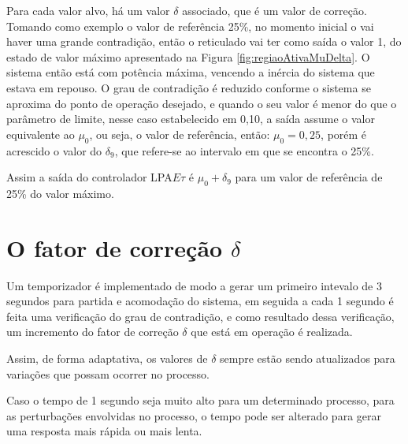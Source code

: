 Para cada valor alvo, há um valor $\delta$ associado, 
que é um valor de correção.
Tomando como exemplo o valor de referência 25\%, 
no momento inicial o vai haver uma grande contradição,
então o reticulado vai ter como saída o valor 1, 
do estado de valor máximo apresentado na 
Figura \ref{fig:regiaoAtivaMuDelta}.
O sistema então está com potência máxima, 
vencendo a inércia do sistema que estava em repouso.
O grau de contradição é reduzido conforme 
o sistema se aproxima do ponto de operação desejado,
e quando o seu valor é menor do que 
o parâmetro de limite, nesse caso estabelecido em 0,10,
a saída assume o valor equivalente ao $\mu_0$, ou seja,
o valor de referência, então: $\mu_0 = 0,25$, porém 
é acrescido o valor do $\delta_9$, 
que refere-se ao intervalo em que se encontra o 25\%.

Assim a saída do controlador LPA$E\tau$ é 
$\mu_0 + \delta_9$
para um valor de referência de 25\% do valor máximo.










\section{O fator de correção $\delta$}

Um temporizador é implementado de modo a 
gerar um primeiro intevalo de 3 segundos para 
partida e acomodação do sistema, 
em seguida a cada 1 segundo é feita uma verificação
do grau de contradição, 
e como resultado dessa verificação, 
um incremento do fator de correção $\delta$ 
que está em operação é realizada. 

Assim, de forma adaptativa, 
os valores de $\delta$ sempre estão sendo atualizados
para variações que possam ocorrer no processo. 

Caso o tempo de 1 segundo seja muito alto para um 
determinado processo, 
para as perturbações envolvidas no processo,
o tempo pode ser alterado para gerar uma resposta 
mais rápida ou mais lenta. 




